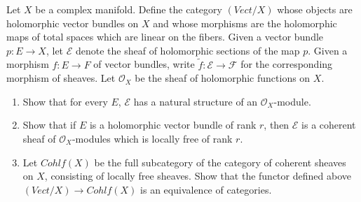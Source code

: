 \documentclass[12pt]{article}
\begin{document}
\begin{problem}{4}
    Let $X$ be a complex manifold. Define the category $(\mathit{Vect}/X)$ whose objects are holomorphic vector bundles on $X$ and whose morphisms are the holomorphic maps of total spaces which are linear on the fibers. Given a vector bundle $p : E \to X$, let $\mathcal{E}$ denote the sheaf of holomorphic sections of the map $p$. Given a morphism $f : E \to F$ of vector bundles, write $\tilde{f} : \mathcal{E} \to \mathcal{F}$ for the corresponding morphism of sheaves. Let $\mathcal{O}_X$ be the sheaf of holomorphic functions on $X$.
\begin{enumerate}
    \item Show that for every $E$, $\mathcal{E}$ has a natural structure of an $\mathcal{O}_X$-module.
    \item Show that if $E$ is a holomorphic vector bundle of rank $r$, then $\mathcal{E}$ is a coherent sheaf of $\mathcal{O}_X$-modules which is locally free of rank $r$.
    \item Let $\mathit{Cohlf}(X)$ be the full subcategory of the category of coherent sheaves on $X$, consisting of locally free sheaves. Show that the functor defined above $(\mathit{Vect}/X) \to \mathit{Cohlf}(X)$ is an equivalence of categories.
\end{enumerate}
\end{problem}
\end{document}
